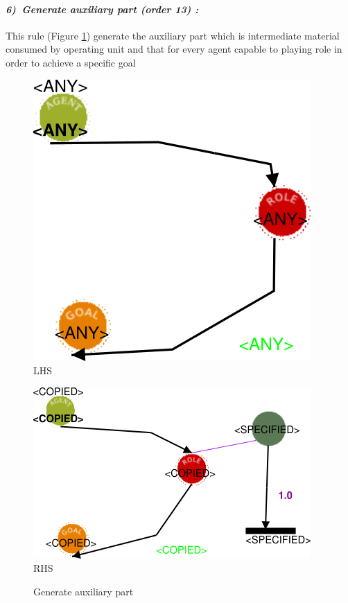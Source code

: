 \paragraph{\emph{6)~Generate auxiliary part  (order 13) :} }
 
 
This rule (Figure \ref{fig:Generate auxiliary part}) 
generate the auxiliary part which is intermediate material consumed by operating unit
and that for every agent capable to playing role in order to achieve a specific goal
\vspace{1cm}
\begin{figure}[th]
\centering
\begin{minipage}{.5\textwidth}
  \begin{center}
  \includegraphics[width=.6\linewidth]{chapiter3/img/L6}
  LHS
  \end{center}
  
\end{minipage}%
\begin{minipage}{.5\textwidth}
  \begin{center}
  \includegraphics[width=.9\linewidth]{chapiter3/img/R6}
  RHS 
  \end{center}
\end{minipage}
\caption{\label{fig:Generate auxiliary part} Generate auxiliary part}
 
\end{figure}
\vspace{1cm}




